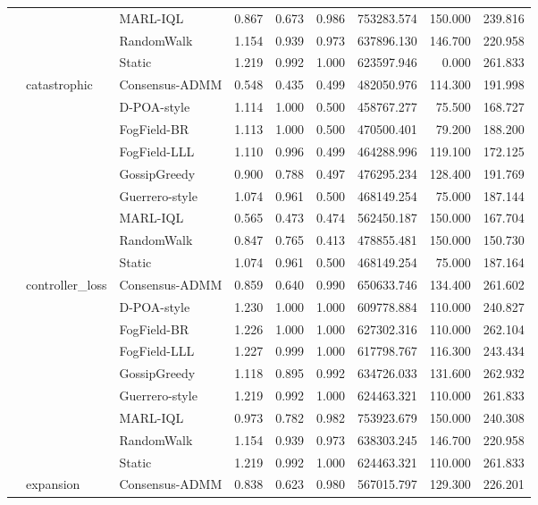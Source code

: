 \begin{table}
\begin{tabular}{lllrrrrrr}
 &  & MARL-IQL & 0.867 & 0.673 & 0.986 & 753283.574 & 150.000 & 239.816 \\
 &  & RandomWalk & 1.154 & 0.939 & 0.973 & 637896.130 & 146.700 & 220.958 \\
 &  & Static & 1.219 & 0.992 & 1.000 & 623597.946 & 0.000 & 261.833 \\
\cline{2-9}
 & \multirow[t]{9}{*}{catastrophic} & Consensus-ADMM & 0.548 & 0.435 & 0.499 & 482050.976 & 114.300 & 191.998 \\
 &  & D-POA-style & 1.114 & 1.000 & 0.500 & 458767.277 & 75.500 & 168.727 \\
 &  & FogField-BR & 1.113 & 1.000 & 0.500 & 470500.401 & 79.200 & 188.200 \\
 &  & FogField-LLL & 1.110 & 0.996 & 0.499 & 464288.996 & 119.100 & 172.125 \\
 &  & GossipGreedy & 0.900 & 0.788 & 0.497 & 476295.234 & 128.400 & 191.769 \\
 &  & Guerrero-style & 1.074 & 0.961 & 0.500 & 468149.254 & 75.000 & 187.144 \\
 &  & MARL-IQL & 0.565 & 0.473 & 0.474 & 562450.187 & 150.000 & 167.704 \\
 &  & RandomWalk & 0.847 & 0.765 & 0.413 & 478855.481 & 150.000 & 150.730 \\
 &  & Static & 1.074 & 0.961 & 0.500 & 468149.254 & 75.000 & 187.164 \\
\cline{2-9}
 & \multirow[t]{9}{*}{controller\_loss} & Consensus-ADMM & 0.859 & 0.640 & 0.990 & 650633.746 & 134.400 & 261.602 \\
 &  & D-POA-style & 1.230 & 1.000 & 1.000 & 609778.884 & 110.000 & 240.827 \\
 &  & FogField-BR & 1.226 & 1.000 & 1.000 & 627302.316 & 110.000 & 262.104 \\
 &  & FogField-LLL & 1.227 & 0.999 & 1.000 & 617798.767 & 116.300 & 243.434 \\
 &  & GossipGreedy & 1.118 & 0.895 & 0.992 & 634726.033 & 131.600 & 262.932 \\
 &  & Guerrero-style & 1.219 & 0.992 & 1.000 & 624463.321 & 110.000 & 261.833 \\
 &  & MARL-IQL & 0.973 & 0.782 & 0.982 & 753923.679 & 150.000 & 240.308 \\
 &  & RandomWalk & 1.154 & 0.939 & 0.973 & 638303.245 & 146.700 & 220.958 \\
 &  & Static & 1.219 & 0.992 & 1.000 & 624463.321 & 110.000 & 261.833 \\
\cline{2-9}
 & \multirow[t]{9}{*}{expansion} & Consensus-ADMM & 0.838 & 0.623 & 0.980 & 567015.797 & 129.300 & 226.201 \\

\end{tabular}
\end{table}
